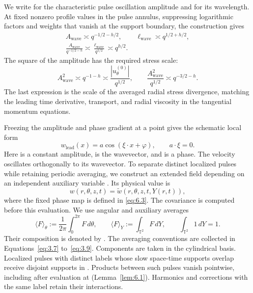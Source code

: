We write  for the characteristic pulse oscillation amplitude
and  for its wavelength. At fixed nonzero profile values in
the pulse annulus, suppressing logarithmic factors and weights that vanish at the support boundary,
the construction gives
\[
 \begin{gathered}
  A_{\mathrm{wave}}\asymp q^{-1/2-h/2},\qquad
  \ell_{\mathrm{wave}}\asymp q^{1/2+h/2},\\
  \frac{A_{\mathrm{wave}}}{q^{-1/2-h}}\asymp
  \frac{\ell_{\mathrm{wave}}}{q^{1/2}}\asymp q^{h/2}.
 \end{gathered}
\]
The square of the amplitude has the required stress scale:
\[
 A_{\mathrm{wave}}^2\asymp q^{-1-h}\asymp
 \frac{|u_\theta^{(0)}|}{q^{1/2}},
 \qquad
 \frac{A_{\mathrm{wave}}^2}{q^{1/2}}\asymp q^{-3/2-h}.
\]
The last expression is the scale of the averaged radial stress divergence, matching the leading
time derivative, transport, and radial viscosity in the tangential momentum equations.

Freezing the amplitude and phase gradient at a point gives the schematic local form
\[
 w_{\mathrm{lead}}(x)=a\cos(\xi\cdot x+\varphi),\qquad a\cdot\xi=0.
\]
Here  is a constant amplitude,
 is the wavevector, and
 is a phase. The velocity oscillates orthogonally to its
wavevector. To separate distinct localized pulses while
%
retaining periodic averaging, we construct an extended field
 depending on an independent auxiliary variable
. Its physical value is
\[
 w(r,\theta,z,t)=\widetilde w(r,\theta,z,t,Y(r,t)),
\]
where the fixed phase map  is defined in \eqref{eq:6.3}. The covariance
is computed before this evaluation. We use angular and auxiliary averages
\[
 \langle F\rangle_\theta:=\frac1{2\pi}\int_0^{2\pi}F\,d\theta,
 \qquad
 \langle F\rangle_Y:=\int_{\mathbb T^2}F\,dY,
 \qquad
 \int_{\mathbb T^2}1\,dY=1.
\]
Their composition is denoted by
. The averaging
conventions are collected in Equations~\eqref{eq:3.7} to~\eqref{eq:3.9}. Components are taken in
the cylindrical basis. Localized pulses with distinct labels whose slow space-time supports overlap
receive disjoint supports in . Products between such pulses vanish pointwise,
including after evaluation at  (Lemma~\ref{lem:6.1}). Harmonics and
corrections with the same label retain their interactions.

